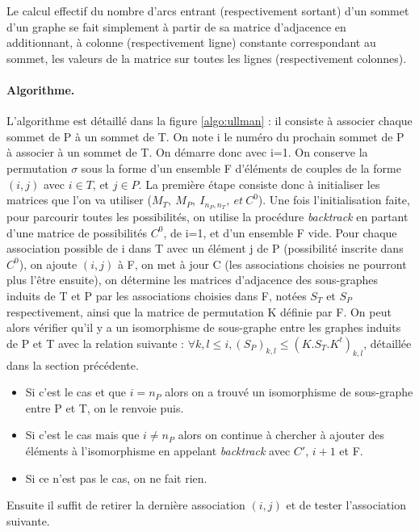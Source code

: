 Le calcul effectif du nombre d'arcs entrant (respectivement sortant) d'un sommet d'un graphe se fait simplement à partir de sa matrice d'adjacence en
additionnant, à colonne (respectivement ligne) constante correspondant au sommet, les valeurs de la matrice sur toutes les lignes (respectivement colonnes).


\paragraph{Algorithme.}
L'algorithme est détaillé dans la figure \ref{algo:ullman} : il consiste à associer chaque sommet de P à un sommet de T. On note i le numéro du prochain sommet de P à associer à un sommet de T. 
On démarre donc avec i=1.
On conserve la permutation $\sigma$ sous la forme d'un ensemble F d'éléments de couples de la forme $(i, j)$ avec $i\in T$, et $j\in P$. 
La première étape consiste donc à initialiser les matrices que l'on va utiliser ($M_T,\ M_P,\ I_{n_P, n_T},\ et\ C^0$). Une fois l'initialisation faite, pour parcourir toutes les possibilités, on utilise la procédure \emph{backtrack} en partant d'une matrice de possibilités $C^0$, de i=1, et d'un ensemble F vide. 
Pour chaque association possible de i dans T avec un élément j de P (possibilité inscrite dans $C^0$), on ajoute $(i, j)$ à F, on met à jour C (les associations choisies ne pourront
plus l'être ensuite), on détermine les matrices d'adjacence des sous-graphes induits de T et P par les associations choisies dans F, notées $S_T$ et $S_P$ respectivement, ainsi que la matrice de permutation K définie par F.
On peut alors vérifier qu'il y a un isomorphisme de sous-graphe entre les graphes induits de P et T avec la relation suivante : $\forall k,l\leq i, (S_P)_{k,l}\leq (K.S_T.K^t)_{k,l}$, détaillée dans la section précédente.
\begin{itemize}
 \item Si c'est le cas et que $i=n_P$ alors on a trouvé un isomorphisme de sous-graphe entre P et T, on le renvoie puis.
 \item Si c'est le cas mais que $i\ne n_P$ alors on continue à chercher à ajouter des éléments à l'isomorphisme en appelant \emph{backtrack} avec $C'$, $i+1$ et F.
 \item Si ce n'est pas le cas, on ne fait rien.
\end{itemize}
Ensuite il suffit de retirer la dernière association $(i, j)$ et de tester l'association suivante. 

